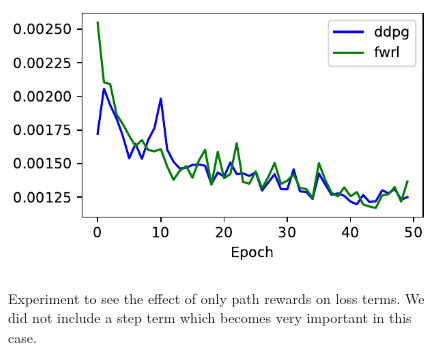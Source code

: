\begin{figure}
  \includegraphics[width=\frac\columnwidth]{media/res/3d07a6e-FetchReachPR-v1-fwrl-future/train/critic_loss.pdf}%
  \label{fig:path-rewards}%
  \caption{Experiment to see the effect of only path rewards on loss terms. We
    did not include a step term which becomes very important in this case.}%
\end{figure}%
% 

